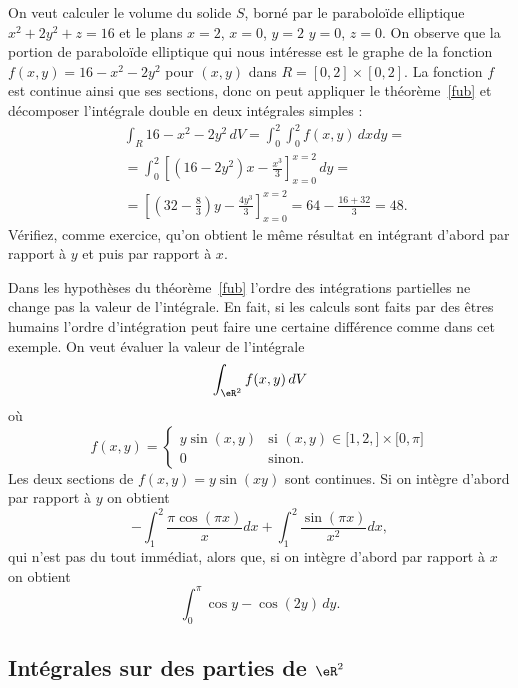 \begin{example}
On veut calculer le volume du solide $S$, borné par le paraboloïde elliptique $x^2+2y^2+z=16$ et le plans $x=2$, $x=0$, $y=2$ $y=0$, $z=0$. On observe que la portion de  paraboloïde elliptique qui nous intéresse est le graphe de la fonction $f(x,y)=16-x^2-2y^2$ pour $(x,y)$ dans $R=[0,2]\times[0,2]$. La fonction $f$ est continue ainsi que ses sections, donc on peut appliquer le théorème~\ref{fub} et décomposer l'intégrale double en deux intégrales simples :
\begin{equation}
  \begin{aligned}
   & \int_R 16-x^2-2y^2 \,dV= \int_{0}^2\int_{0}^2f(x,y)\,dx dy= \\
&=\int_0^2 \left[(16-2y^2)x-\frac{x^3}{3}\right]_{x=0}^{x=2}\, dy =\\
& = \left[ \left(32-\frac{8}{3}\right) y -\frac{4y^3}{3}\right]_{x=0}^{x=2}= 64- \frac{16+32}{3}=48.
  \end{aligned}
\end{equation}
Vérifiez, comme exercice, qu'on obtient le même résultat en intégrant d'abord par rapport à $y$ et puis par rapport à $x$.
\end{example}

\begin{example}
  Dans les hypothèses du théorème~\ref{fub}  l'ordre des intégrations partielles ne change pas la valeur de l'intégrale. En fait, si les calculs sont faits par des êtres humains l'ordre d'intégration peut faire une certaine différence comme dans cet exemple. On veut évaluer la valeur de l'intégrale
\[
\int_{\eR^2}f(x,y)\, dV
\]
où
\begin{equation}
	f(x,y)=\begin{cases}
		y\sin(x,y)	&	\text{si }(x,y)\in\mathopen[ 1,2 ,  \mathclose]\times\mathopen[ 0 , \pi \mathclose]\\
		0	&	 \text{sinon.}
	\end{cases}
\end{equation}
Les deux sections de $f(x,y)=y\sin(xy)$ sont continues. Si on intègre d'abord par rapport à $y$ on obtient
\[
-\int_1^2\frac{ \pi\cos(\pi x) }{ x }dx+\int_1^2\frac{ \sin(\pi x) }{ x^2 }dx,
\]
qui n'est pas du tout immédiat, alors que, si on intègre d'abord par rapport à $x$ on obtient
\[
\int_0^\pi \cos y - \cos(2y)\,dy.
\]
\end{example}

\subsection{Intégrales sur des parties de $\eR^2$ }

